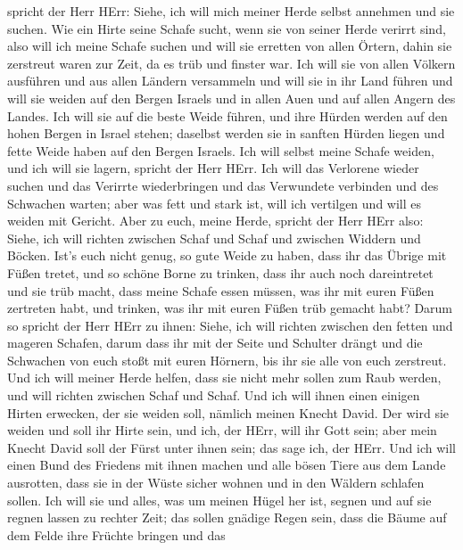 spricht der Herr HErr: Siehe, ich will mich meiner Herde selbst annehmen
und sie suchen.  Wie ein Hirte seine Schafe sucht, wenn sie
von seiner Herde verirrt sind, also will ich meine Schafe suchen und
will sie erretten von allen Örtern, dahin sie zerstreut waren zur Zeit,
da es trüb und finster war.  Ich will sie von allen Völkern
ausführen und aus allen Ländern versammeln und will sie in ihr Land
führen und will sie weiden auf den Bergen Israels und in allen Auen und
auf allen Angern des Landes.  Ich will sie auf die beste
Weide führen, und ihre Hürden werden auf den hohen Bergen in Israel
stehen; daselbst werden sie in sanften Hürden liegen und fette Weide
haben auf den Bergen Israels.  Ich will selbst meine Schafe
weiden, und ich will sie lagern, spricht der Herr HErr. 
Ich will das Verlorene wieder suchen und das Verirrte wiederbringen und
das Verwundete verbinden und des Schwachen warten; aber was fett und
stark ist, will ich vertilgen und will es weiden mit Gericht.
 Aber zu euch, meine Herde, spricht der Herr HErr also:
Siehe, ich will richten zwischen Schaf und Schaf und zwischen Widdern
und Böcken.  Ist's euch nicht genug, so gute Weide zu
haben, dass ihr das Übrige mit Füßen tretet, und so schöne Borne zu
trinken, dass ihr auch noch dareintretet und sie trüb macht,
 dass meine Schafe essen müssen, was ihr mit euren Füßen
zertreten habt, und trinken, was ihr mit euren Füßen trüb gemacht habt?
 Darum so spricht der Herr HErr zu ihnen: Siehe, ich will
richten zwischen den fetten und mageren Schafen,  darum
dass ihr mit der Seite und Schulter drängt und die Schwachen von euch
stoßt mit euren Hörnern, bis ihr sie alle von euch zerstreut.
 Und ich will meiner Herde helfen, dass sie nicht mehr
sollen zum Raub werden, und will richten zwischen Schaf und Schaf.
 Und ich will ihnen einen einigen Hirten erwecken, der sie
weiden soll, nämlich meinen Knecht David. Der wird sie weiden und soll
ihr Hirte sein,  und ich, der HErr, will ihr Gott sein;
aber mein Knecht David soll der Fürst unter ihnen sein; das sage ich,
der HErr.  Und ich will einen Bund des Friedens mit ihnen
machen und alle bösen Tiere aus dem Lande ausrotten, dass sie in der
Wüste sicher wohnen und in den Wäldern schlafen sollen. 
Ich will sie und alles, was um meinen Hügel her ist, segnen und auf sie
regnen lassen zu rechter Zeit; das sollen gnädige Regen sein,
 dass die Bäume auf dem Felde ihre Früchte bringen und das
